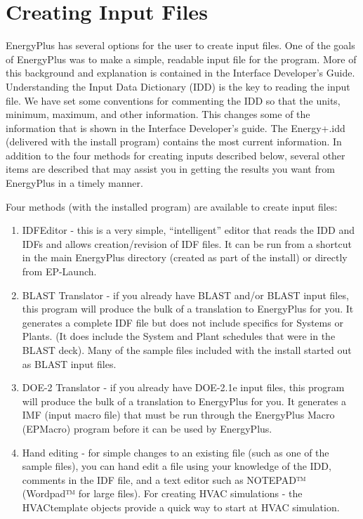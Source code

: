 \chapter{Creating Input Files}\label{creating-input-files}

EnergyPlus has several options for the user to create input files. One of the goals of EnergyPlus was to make a simple, readable input file for the program. More of this background and explanation is contained in the Interface Developer's Guide. Understanding the Input Data Dictionary (IDD) is the key to reading the input file. We have set some conventions for commenting the IDD so that the units, minimum, maximum, and other information. This changes some of the information that is shown in the Interface Developer's guide. The Energy+.idd (delivered with the install program) contains the most current information. In addition to the four methods for creating inputs described below, several other items are described that may assist you in getting the results you want from EnergyPlus in a timely manner.

Four methods (with the installed program) are available to create input files:

\begin{enumerate}
\def\labelenumi{\arabic{enumi})}
\item
  IDFEditor - this is a very simple, ``intelligent'' editor that reads the IDD and IDFs and allows creation/revision of IDF files. It can be run from a shortcut in the main EnergyPlus directory (created as part of the install) or directly from EP-Launch.
\item
  BLAST Translator - if you already have BLAST and/or BLAST input files, this program will produce the bulk of a translation to EnergyPlus for you. It generates a complete IDF file but does not include specifics for Systems or Plants. (It does include the System and Plant schedules that were in the BLAST deck). Many of the sample files included with the install started out as BLAST input files.
\item
  DOE-2 Translator - if you already have DOE-2.1e input files, this program will produce the bulk of a translation to EnergyPlus for you. It generates a IMF (input macro file) that must be run through the EnergyPlus Macro (EPMacro) program before it can be used by EnergyPlus.
\item
  Hand editing - for simple changes to an existing file (such as one of the sample files), you can hand edit a file using your knowledge of the IDD, comments in the IDF file, and a text editor such as NOTEPAD™ (Wordpad™ for large files). For creating HVAC simulations - the HVACtemplate objects provide a quick way to start at HVAC simulation.
\end{enumerate}
